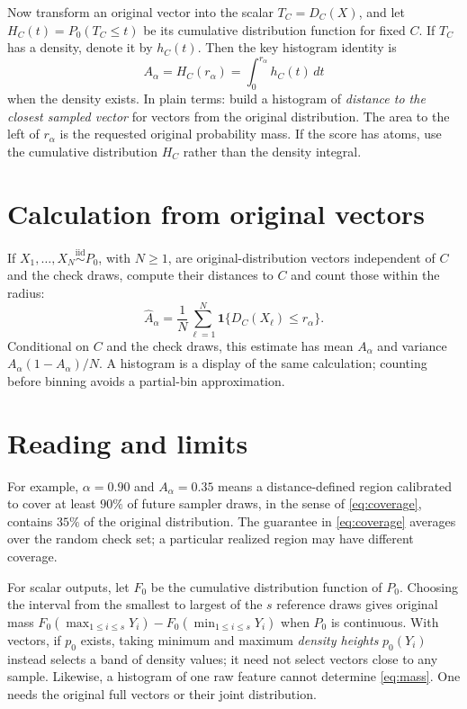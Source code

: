 \documentclass[10pt,letterpaper]{article}
\theoremstyle{typed}
\begin{document}
Now transform an original vector into the scalar $T_C=D_C(X)$, and let $H_C(t)=P_0(T_C\leq t)$ be its cumulative distribution function for fixed $C$. If $T_C$ has a density, denote it by $h_C(t)$. Then the key histogram identity is
\begin{equation}
  \boxed{\quad A_\alpha=H_C(r_\alpha)
  =\int_0^{r_\alpha}h_C(t)\,dt\quad}
  \label{eq:histogram}
\end{equation}
when the density exists. In plain terms: build a histogram of \emph{distance to the closest sampled vector} for vectors from the original distribution. The area to the left of $r_\alpha$ is the requested original probability mass. If the score has atoms, use the cumulative distribution $H_C$ rather than the density integral.

\section{Calculation from original vectors}

If $X_1,\ldots,X_N\overset{\mathrm{iid}}{\sim}P_0$, with $N\geq1$, are original-distribution vectors independent of $C$ and the check draws, compute their distances to $C$ and count those within the radius:
\begin{equation}
  \widehat A_\alpha=\frac{1}{N}\sum_{\ell=1}^{N}
  \mathbf{1}\{D_C(X_\ell)\leq r_\alpha\}.
  \label{eq:estimate}
\end{equation}
Conditional on $C$ and the check draws, this estimate has mean $A_\alpha$ and variance $A_\alpha(1-A_\alpha)/N$. A histogram is a display of the same calculation; counting before binning avoids a partial-bin approximation.

\section{Reading and limits}

For example, $\alpha=0.90$ and $A_\alpha=0.35$ means a distance-defined region calibrated to cover at least $90\%$ of future sampler draws, in the sense of \eqref{eq:coverage}, contains $35\%$ of the original distribution. The guarantee in \eqref{eq:coverage} averages over the random check set; a particular realized region may have different coverage.

For scalar outputs, let $F_0$ be the cumulative distribution function of $P_0$. Choosing the interval from the smallest to largest of the $s$ reference draws gives original mass $F_0(\max_{1\leq i\leq s}Y_i)-F_0(\min_{1\leq i\leq s}Y_i)$ when $P_0$ is continuous. With vectors, if $p_0$ exists, taking minimum and maximum \emph{density heights} $p_0(Y_i)$ instead selects a band of density values; it need not select vectors close to any sample. Likewise, a histogram of one raw feature cannot determine \eqref{eq:mass}. One needs the original full vectors or their joint distribution.
\end{document}
